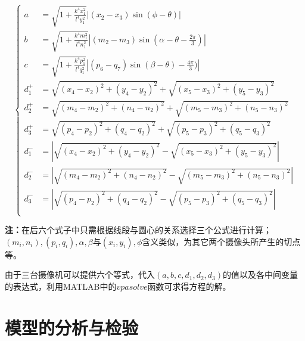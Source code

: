 \documentclass[a4paper,10.5pt]{ctexart}
\begin{document}
\begin{equation}
\nonumber
\left\{
\begin{aligned}
a&=\sqrt{1+\frac{k^4x_1^2}{l^4y_1^2}}|(x_2-x_3)\sin(\phi-\theta)|\\
b&=\sqrt{1+\frac{k^4m_1^2}{l^4n_1^2}}|(m_2-m_3)\sin(\alpha -\theta-\frac{2\pi}{3})|\\
c&=\sqrt{1+\frac{k^4p_1^2}{l^4q_1^2}}|(p_6-q_7)\sin(\beta -\theta)-\frac{4\pi}{3})|\\
d_1^{+}&=\sqrt{(x_4-x_2)^2+(y_4-y_2)^2}+\sqrt{(x_5-x_3)^2+(y_5-y_3)^2}\\
d_2^{+}&=\sqrt{(m_4-m_2)^2+(n_4-n_2)^2}+\sqrt{(m_5-m_3)^2+(n_5-n_3)^2}\\
d_3^{+}&=\sqrt{(p_4-p_2)^2+(q_4-q_2)^2}+\sqrt{(p_5-p_3)^2+(q_5-q_3)^2}\\
d_1^{-}&=|\sqrt{(x_4-x_2)^2+(y_4-y_2)^2}-\sqrt{(x_5-x_3)^2+(y_5-y_3)^2}|\\
d_2^{-}&=|\sqrt{(m_4-m_2)^2+(n_4-n_2)^2}-\sqrt{(m_5-m_3)^2+(n_5-n_3)^2}|\\
d_3^{-}&=|\sqrt{(p_4-p_2)^2+(q_4-q_2)^2}-\sqrt{(p_5-p_3)^2+(q_5-q_3)^2}|\\
\end{aligned}
\right.
\end{equation}
\par {\bf 注：}在后六个式子中只需根据线段与圆心的关系选择三个公式进行计算；$(m_i,n_i),(p_i,q_i),\alpha ,\beta$与$(x_i,y_i),\phi$含义类似，为其它两个摄像头所产生的切点等。
\par 由于三台摄像机可以提供六个等式，代入$(a,b,c,d_1,d_2,d_3)$的值以及各中间变量的表达式，利用MATLAB中的$vpasolve$函数可求得方程的解。
~\\
\par 

\section{模型的分析与检验}
\end{document}
